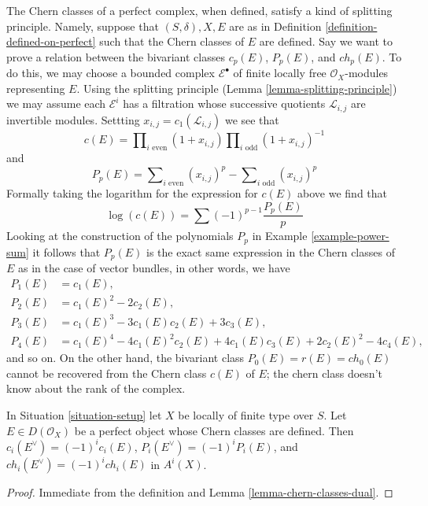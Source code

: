 \begin{remark}
\label{remark-splitting-principle-perfect}
The Chern classes of a perfect complex, when defined, satisfy a kind of
splitting principle. Namely, suppose that $(S, \delta), X, E$ are as in
Definition \ref{definition-defined-on-perfect}
such that the Chern classes of $E$ are defined.
Say we want to prove a relation between the bivariant classes
$c_p(E)$, $P_p(E)$, and $ch_p(E)$. To do this, we may choose a bounded
complex $\mathcal{E}^\bullet$ of finite locally free $\mathcal{O}_X$-modules
representing $E$. Using the splitting principle
(Lemma \ref{lemma-splitting-principle}) we may assume each
$\mathcal{E}^i$ has a filtration whose successive
quotients $\mathcal{L}_{i, j}$ are invertible modules.
Settting $x_{i, j} = c_1(\mathcal{L}_{i, j})$ we see that
$$
c(E) =
\prod\nolimits_{i\text{ even}} (1 + x_{i, j})
\prod\nolimits_{i\text{ odd}} (1 + x_{i, j})^{-1}
$$
and
$$
P_p(E) =  \sum\nolimits_{i\text{ even}} (x_{i, j})^p -
\sum\nolimits_{i\text{ odd}} (x_{i, j})^p
$$
Formally taking the logarithm for the expression for $c(E)$ above
we find that
$$
\log(c(E)) = \sum (-1)^{p - 1}\frac{P_p(E)}{p}
$$
Looking at the construction of the polynomials $P_p$ in
Example \ref{example-power-sum} it follows that $P_p(E)$
is the exact same expression in the Chern classes of $E$
as in the case of vector bundles, in other words, we have
\begin{align*}
P_1(E) & = c_1(E), \\
P_2(E) & = c_1(E)^2 - 2c_2(E), \\
P_3(E) & = c_1(E)^3 - 3c_1(E)c_2(E) + 3c_3(E), \\
P_4(E) & = c_1(E)^4 - 4c_1(E)^2c_2(E) + 4c_1(E)c_3(E) + 2c_2(E)^2 - 4c_4(E),
\end{align*}
and so on. On the other hand, the bivariant class $P_0(E) = r(E) = ch_0(E)$
cannot be recovered from the Chern class $c(E)$ of $E$; the chern class
doesn't know about the rank of the complex.
\end{remark}

\begin{lemma}
\label{lemma-chern-classes-perfect-dual}
In Situation \ref{situation-setup} let $X$ be locally of finite type over $S$.
Let $E \in D(\mathcal{O}_X)$ be a perfect object whose Chern classes are
defined. Then $c_i(E^\vee) = (-1)^i c_i(E)$, $P_i(E^\vee) = (-1)^iP_i(E)$,
and $ch_i(E^\vee) = (-1)^ich_i(E)$ in $A^i(X)$.
\end{lemma}

\begin{proof}
Immediate from the definition and Lemma \ref{lemma-chern-classes-dual}.
\end{proof}

